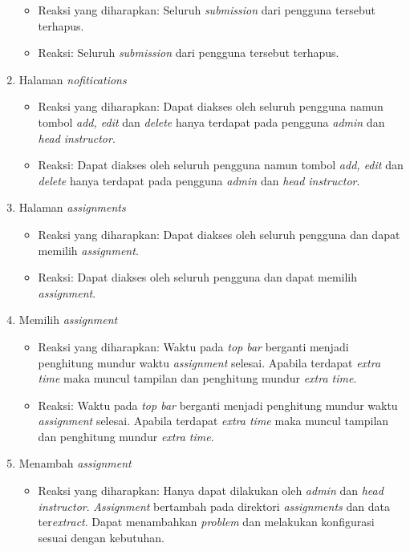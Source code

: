 \begin{enumerate}
\begin{itemize}
	 	\item Reaksi yang diharapkan: Seluruh \textit{submission} dari pengguna tersebut terhapus.
	 	\item Reaksi: Seluruh \textit{submission} dari pengguna tersebut terhapus.
	 \end{itemize}
	 \item Halaman \textit{nofitications}
	 \begin{itemize}
	 	\item Reaksi yang diharapkan: Dapat diakses oleh seluruh pengguna namun tombol \textit{add, edit} dan \textit{delete} hanya terdapat pada pengguna \textit{admin} dan \textit{head instructor}.
	 	\item Reaksi: Dapat diakses oleh seluruh pengguna namun tombol \textit{add, edit} dan \textit{delete} hanya terdapat pada pengguna \textit{admin} dan \textit{head instructor}.
	 \end{itemize}
	 \item Halaman \textit{assignments}
	 \begin{itemize}
	 	\item Reaksi yang diharapkan: Dapat diakses oleh seluruh pengguna dan dapat memilih \textit{assignment}.
	 	\item Reaksi: Dapat diakses oleh seluruh pengguna dan dapat memilih \textit{assignment}.
	 \end{itemize}
	 \item Memilih \textit{assignment}
	 \begin{itemize}
	 	\item Reaksi yang diharapkan: Waktu pada \textit{top bar} berganti menjadi penghitung mundur waktu \textit{assignment} selesai. Apabila terdapat \textit{extra time} maka muncul tampilan dan penghitung mundur \textit{extra time}.
	 	\item Reaksi: Waktu pada \textit{top bar} berganti menjadi penghitung mundur waktu \textit{assignment} selesai. Apabila terdapat \textit{extra time} maka muncul tampilan dan penghitung mundur \textit{extra time}.
	 \end{itemize}
	 \item Menambah \textit{assignment}
	 \begin{itemize}
	 	\item Reaksi yang diharapkan: Hanya dapat dilakukan oleh \textit{admin} dan \textit{head instructor}. \textit{Assignment} bertambah pada direktori \textit{assignments} dan data ter\textit{extract}. Dapat menambahkan \textit{problem} dan melakukan konfigurasi sesuai dengan kebutuhan.

\end{itemize}
\end{enumerate}
